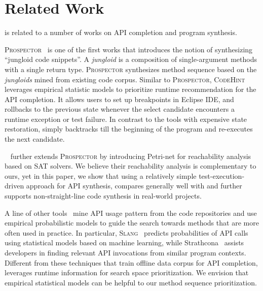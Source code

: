 \section{Related Work}\label{sec:related}

\tool is related to a number of works on API completion and program synthesis. 


   \textsc{Prospector}~\cite{jungloid:pldi05} is one of the first works that introduces the notion of synthesizing   ``jungloid code snippets''. A \textit{jungloid} is a composition of single-argument methods with a single return type.  \textsc{Prospector} synthesizes method sequence based on the  \textit{jungloids} mined from existing code corpus. Similar to  \textsc{Prospector},  \textsc{CodeHint}~\cite{codehint:icse14} leverages empirical statistic models to prioritize runtime recommendation for the API completion. It allows users to set up breakpoints in Eclipse IDE, and rollbacks to the previous state whenever the select candidate encounters a runtime exception or test failure. In contrast to the tools with expensive state restoration, \tool simply backtracks till the beginning of the program and re-executes the next candidate. 

\spt~\cite{isil:sypet17} further extends  \textsc{Prospector} by introducing Petri-net for reachability analysis based on SAT solvers. We believe their reachability analysis is complementary to ours, yet in this paper, we show that using a relatively simple test-execution-driven approach for API synthesis, \tool compares generally well with \spt and further supports non-straight-line code synthesis in real-world projects. 

A line of other tools~\cite{mineAPI:msr13, tienAPI:icse14, portfolio:icse13, parseWeb:tao07} mine API usage pattern from the code repositories and  use empirical probabilistic models to guide the search towards methods that are more often used in practice. In particular,  \textsc{Slang}~\cite{slang:pldi14} predicts probabilities of API calls using statistical models based on machine learning,  while Strathcona~\cite{strathcona:icse05} assists developers in finding relevant API invocations from similar program contexts. Different from these techniques that train offline data corpus for API completion, \tool leverages runtime information for search space prioritization. We envision that  empirical statistical models can be helpful to our method sequence prioritization.


